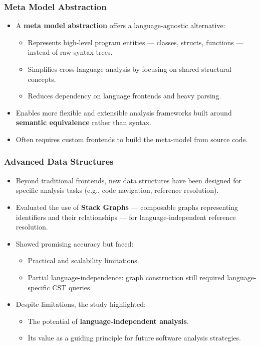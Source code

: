 \documentclass[dvipsnames, 10pt, table]{beamer}
\begin{document}
\begin{frame}
  \frametitle{Meta Model Abstraction}
  \begin{itemize}
    \item A \textbf{meta model abstraction} offers a language-agnostic alternative:
    \begin{itemize}
        \item Represents high-level program entities — classes, structs, functions — instead of raw syntax trees.
        \item Simplifies cross-language analysis by focusing on shared structural concepts.
        \item Reduces dependency on language frontends and heavy parsing.
    \end{itemize}
    \item Enables more flexible and extensible analysis frameworks built around \textbf{semantic equivalence} rather than syntax.
    \item Often requires custom frontends to build the meta-model from source code.
  \end{itemize}
\end{frame}

\begin{frame}
  \frametitle{Advanced Data Structures}
  \begin{itemize}
      \item Beyond traditional frontends, new data structures have been designed for specific analysis tasks 
      (e.g., code navigation, reference resolution).
      \item Evaluated the use of \textbf{Stack Graphs} — composable graphs representing identifiers 
      and their relationships — for language-independent reference resolution.
      \item Showed promising accuracy but faced:
      \begin{itemize}
          \item Practical and scalability limitations.
          \item Partial language-independence: graph construction still required language-specific CST queries.
      \end{itemize}
      \item Despite limitations, the study highlighted:
      \begin{itemize}
          \item The potential of \textbf{language-independent analysis}.
          \item Its value as a guiding principle for future software analysis strategies.
      \end{itemize}
  \end{itemize}
\end{frame}
\end{document}
